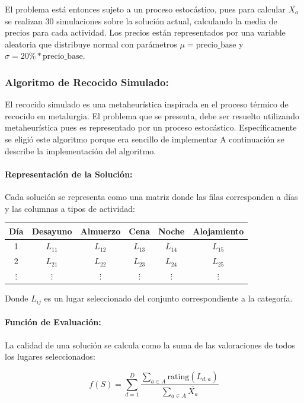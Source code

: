 \documentclass[10pt]{llncs}
\begin{document}
El problema está entonces sujeto a un proceso estocástico, pues para calcular $\overline{X_a}$ se realizan 30 simulaciones 
sobre la solución actual, calculando la media de precios para cada actividad. Los precios están representados por una variable aleatoria 
que distribuye normal con parámetros $\mu = \text{precio\_base}$ y $\sigma = 20\% * \text{precio\_base}$.

\subsubsection{Algoritmo de Recocido Simulado:}
El recocido simulado es una metaheurística inspirada en el proceso térmico de recocido en metalurgia. El problema que se presenta, debe ser resuelto utilizando 
metaheurística pues es representado por un proceso estocástico. Específicamente se eligió este algoritmo porque era sencillo de implementar
A continuación se describe la implementación del algoritmo.

\paragraph{Representación de la Solución:}
Cada solución se representa como una matriz donde las filas corresponden a días y las columnas a tipos de actividad:

\begin{center}
\begin{tabular}{c|c|c|c|c|c}
Día & Desayuno & Almuerzo & Cena & Noche & Alojamiento \\
\midrule
1 & $L_{11}$ & $L_{12}$ & $L_{13}$ & $L_{14}$ & $L_{15}$ \\
2 & $L_{21}$ & $L_{22}$ & $L_{23}$ & $L_{24}$ & $L_{25}$ \\
$\vdots$ & $\vdots$ & $\vdots$ & $\vdots$ & $\vdots$ & $\vdots$ \\
\end{tabular}
\end{center}

Donde $L_{ij}$ es un lugar seleccionado del conjunto correspondiente a la categoría.

\paragraph{Función de Evaluación:}
La calidad de una solución se calcula como la suma de las valoraciones de todos los lugares seleccionados:

\[
f(S) = \sum_{d=1}^{D} \dfrac{\sum_{a \in A} \text{rating}(L_{d,a})}{\sum_{a \in A} \overline{X_a}}
\]
\end{document}
